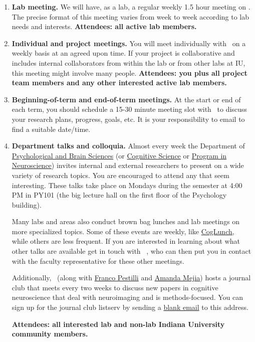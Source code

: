 \documentclass{tufte-book} %
\begin{document}
\begin{enumerate}
\item \textbf{Lab meeting.} We will have, as a lab, a regular weekly 1.5 hour meeting on \textbf{\labmeetingtime}. The precise format of this meeting varies from week to week according to lab needs and interests. \textbf{Attendees: all active lab members.}

\item \textbf{Individual and project meetings.} You will meet individually with \director~on a weekly basis at an agreed upon time. If your project is collaborative and includes internal collaborators from within the lab or from other labs at IU, this meeting might involve many people. \textbf{Attendees: you plus all project team members and any other interested active lab members.}


 \item \textbf{Beginning-of-term and end-of-term meetings.} At the start or end of each term, you should schedule a 15-30 minute meeting slot with \director~to discuss your research plans, progress, goals, etc. It is your responsibility to email \href{rbetzel@indiana.edu}{\director} to find a suitable date/time.
 
 \item \textbf{Department talks and colloquia.} Almost every week the Department of \href{https://apps.iu.edu/ccl-prd/events/view?type=day&pubCalId=GRP1479}{Psychological and Brain Sciences} (or \href{http://cogs.indiana.edu/events/q733-colloquium.php}{Cognitive Science} or \href{https://neuroscience.indiana.edu/news-events/neuroscience-colloquium-series/index.html}{Program in Neuroscience}) invites internal and external researchers to present on a wide variety of research topics. You are encouraged to attend any that seem interesting. These talks take place on Mondays during the semester at 4:00 PM in PY101 (the big lecture hall on the first floor of the Psychology building).
 
 Many labs and areas also conduct brown bag lunches and lab meetings on more specialized topics. Some of these events are weekly, like \href{http://cogs.indiana.edu/events/cognitive-lunch.php}{CogLunch}, while others are less frequent. If you are interested in learning about what other talks are available get in touch with \director~, who can then put you in contact with the faculty representative for these other meetings.
 
 Additionally, \director~(along with \href{https://brainlife.github.io/plab/}{Franco Pestilli} and \href{https://stat.indiana.edu/about/faculty/core-faculty/mejia-amanda.html}{Amanda Mejia}) hosts a journal club that meets every two weeks to discuss new papers in cognitive neuroscience that deal with neuroimaging and is methods-focused. You can sign up for the journal club listserv by sending a \href{clubneuro-l-subscribe@list.indiana.edu}{blank email} to this address.
 
 \textbf{Attendees: all interested lab and non-lab Indiana University community members.}

\end{enumerate}
\end{document}

